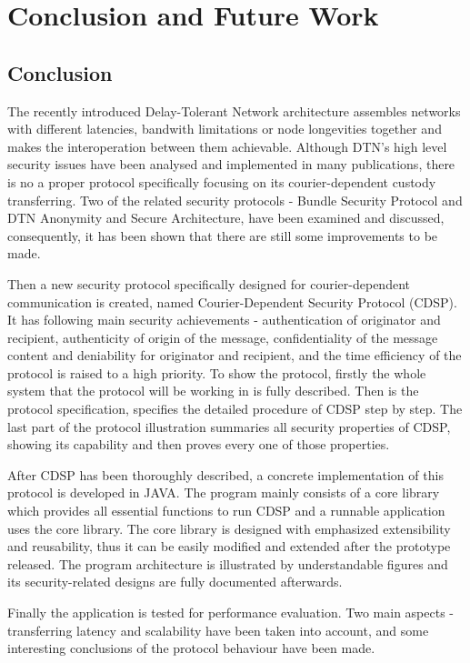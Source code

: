 \chapter{Conclusion and Future Work}
\section{Conclusion}
The recently introduced Delay-Tolerant Network architecture assembles networks with different latencies, bandwith limitations or node longevities together and makes the interoperation between them achievable. Although DTN's high level security issues have been analysed and implemented in many publications, there is no a proper protocol specifically focusing on its courier-dependent custody transferring. Two of the related security protocols - Bundle Security Protocol and DTN Anonymity and Secure Architecture, have been examined and discussed, consequently, it has been shown that there are still some improvements to be made.

Then a new security protocol specifically designed for courier-dependent communication is created, named Courier-Dependent Security Protocol (CDSP). It has following main security achievements - authentication of originator and recipient, authenticity of origin of the message, confidentiality of the message content and deniability for originator and recipient, and the time efficiency of the protocol is raised to a high priority. To show the protocol, firstly the whole system that the protocol will be working in is fully described. Then is the protocol specification, specifies the detailed procedure of CDSP step by step. The last part of the protocol illustration summaries all security properties of CDSP, showing its capability and then proves every one of those properties. 

After CDSP has been thoroughly described, a concrete implementation of this protocol is developed in JAVA. The program mainly consists of a core library which provides all essential functions to run CDSP and a runnable application uses the core library. The core library is designed with emphasized extensibility and reusability, thus it can be easily modified and extended after the prototype released. The program architecture is illustrated by understandable figures and its security-related designs are fully documented afterwards.

Finally the application is tested for performance evaluation. Two main aspects - transferring latency and scalability have been taken into account, and some interesting conclusions of the protocol behaviour have been made.

